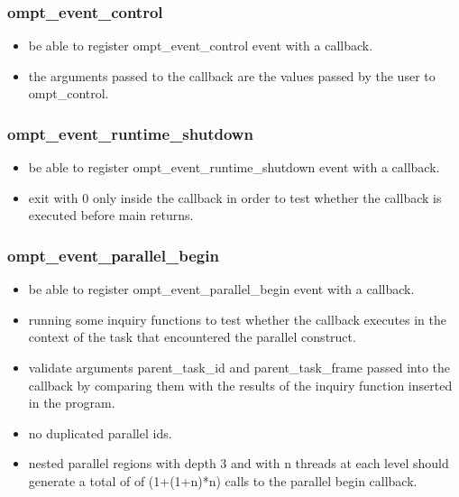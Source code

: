 \documentclass{article}
\begin{document}
\subsubsection{ompt\_event\_control}
    \begin{itemize}
        \item  be able to register ompt\_event\_control event with a callback.
        \item  the arguments passed to the callback are the values passed by the user to ompt\_control.
    \end{itemize}

\subsubsection{ompt\_event\_runtime\_shutdown}
    \begin{itemize}
        \item  be able to register ompt\_event\_runtime\_shutdown event with a callback.
        \item  exit with 0 only inside the callback in order to test whether the callback is executed before main returns.
    \end{itemize}


\subsubsection{ompt\_event\_parallel\_begin}
    \begin{itemize}
        \item  be able to register ompt\_event\_parallel\_begin event with a callback.
        \item  running some inquiry functions to test whether the callback executes in the context of the task that encountered the parallel construct.
        \item  validate arguments parent\_task\_id and parent\_task\_frame passed into the callback by comparing them with the results of the  inquiry function inserted in the program.
        \item  no duplicated parallel ids.
        \item  nested parallel regions with depth 3 and with n threads at each level should generate a total of of (1+(1+n)*n) calls to the parallel begin callback.
    \end{itemize}
\end{document}
